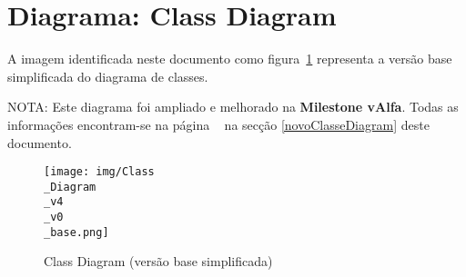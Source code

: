 
\section{Diagrama: Class Diagram}\label{oldClasseDiagram}

A imagem identificada neste documento como figura~\ref{fig:cd3130} representa a versão base simplificada do diagrama de classes. 

\noindent NOTA: Este diagrama foi ampliado e melhorado na \textbf{Milestone vAlfa}. Todas as informações encontram-se na página ~\pageref{novoClasseDiagram} na secção \ref{novoClasseDiagram} deste documento.

\begin{figure}[htb]
	\centering
	\texttt{[image: img/Class\\\_Diagram\\\_v4\\\_v0\\\_base.png]}  %
	\caption{Class Diagram (versão base simplificada)}
	\label{fig:cd3130}
\end{figure}


